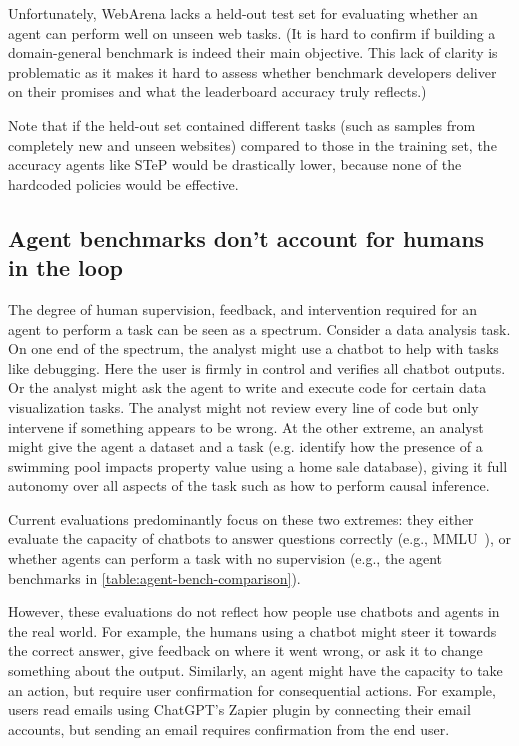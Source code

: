 \documentclass{article}
\begin{document}
Unfortunately, WebArena lacks a held-out test set for evaluating whether an agent can perform well on unseen web tasks. (It is hard to confirm if building a domain-general benchmark is indeed their main objective. This lack of clarity is problematic as it makes it hard to assess whether benchmark developers deliver on their promises and what the leaderboard accuracy truly reflects.)

Note that if the held-out set contained different tasks (such as samples from completely new and unseen websites) compared to those in the training set, the accuracy agents like STeP would be drastically lower, because none of the hardcoded policies would be effective. 











\subsection{Agent benchmarks don't account for humans in the loop}
\label{sec:human-in-the-loop}


The degree of human supervision, feedback, and intervention required for an agent to perform a task can be seen as a spectrum. %
Consider a data analysis task. On one end of the spectrum, the analyst might use a chatbot to help with tasks like debugging. Here the user is firmly in control and verifies all chatbot outputs. Or the analyst might ask the agent to write and execute code for certain data visualization tasks. The analyst might not review every line of code but only intervene if something appears to be wrong. At the other extreme, an analyst might give the agent a dataset and a task (e.g. identify how the presence of a swimming pool impacts property value using a home sale database), giving it full autonomy over all aspects of the task such as how to perform causal inference. 


Current evaluations predominantly focus on these two extremes: they either evaluate the capacity of chatbots to answer questions correctly (e.g., MMLU~\citep{hendrycks_measuring_2021}), or whether agents can perform a task with no supervision (e.g., the agent benchmarks in \cref{table:agent-bench-comparison}).


However, these evaluations do not reflect how people use chatbots and agents in the real world. For example, the humans using a chatbot might steer it towards the correct answer, give feedback on where it went wrong, or ask it to change something about the output. Similarly, an agent might have the capacity to take an action, but require user confirmation for consequential actions. For example, users read emails using ChatGPT's Zapier plugin by connecting their email accounts, but sending an email requires confirmation from the end user. 
\end{document}
